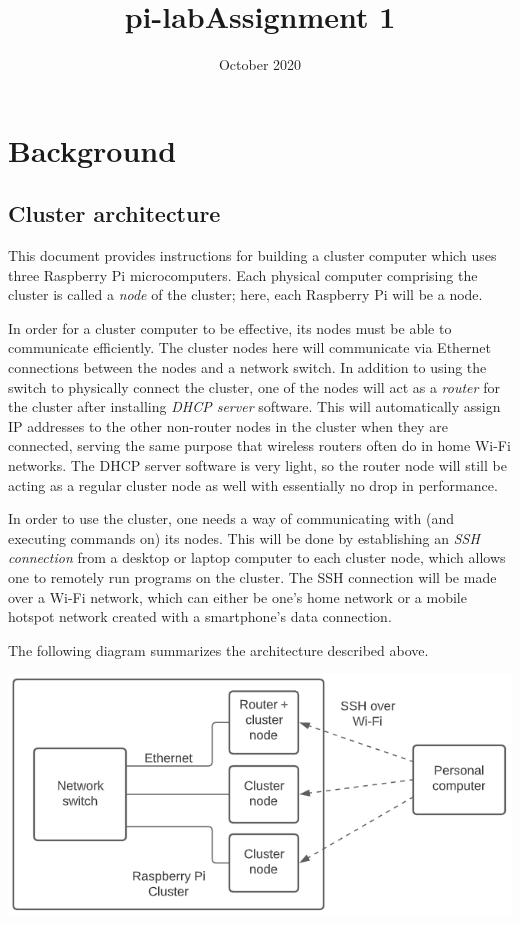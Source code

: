 \documentclass{article}
\title{pi-lab}
\date{October 2020}
\begin{document}
\title{Assignment 1}

\section{Background}

\subsection{Cluster architecture}

This document provides instructions for building a cluster computer which uses three Raspberry Pi microcomputers. Each physical computer comprising the cluster is called a \emph{node} of the cluster; here, each Raspberry Pi will be a node.

In order for a cluster computer to be effective, its nodes must be able to communicate efficiently. The cluster nodes here will communicate via Ethernet connections between the nodes and a network switch. In addition to using the switch to physically connect the cluster, one of the nodes will act as a \emph{router} for the cluster after installing \emph{DHCP server} software. This will automatically assign IP addresses to the other non-router nodes in the cluster when they are connected, serving the same purpose that wireless routers often do in home Wi-Fi networks. The DHCP server software is very light, so the router node will still be acting as a regular cluster node as well with essentially no drop in performance. 

In order to use the cluster, one needs a way of communicating with (and executing commands on) its nodes. This will be done by establishing an \emph{SSH connection} from a desktop or laptop computer to each cluster node, which allows one to remotely run programs on the cluster. The SSH connection will be made over a Wi-Fi network, which can either be one's home network or a mobile hotspot network created with a smartphone's data connection.

The following diagram summarizes the architecture described above.

\includegraphics[width=\textwidth]{images/cluster-diagram.png}
\end{document}
